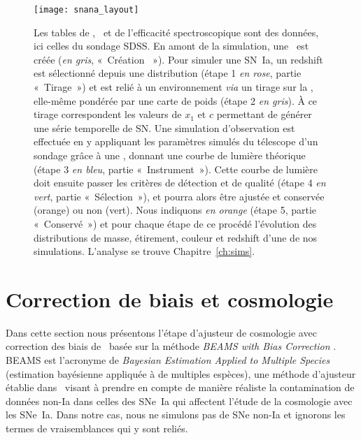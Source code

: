 \documentclass[../main/main.tex]{subfiles}
\begin{document}
\begin{figure}[p]
    \vspace*{-2.9cm}
    \centerfloat
    \texttt{[image: snana\_layout]}
    \caption[Schéma de fonctionnement d'une simulation avec
    \snana]{\footnotesize Les tables de \wgtmap, \simlib\ et de l'efficacité
        spectroscopique sont des données, ici celles du sondage SDSS. En amont
        de la simulation, une \hostlib\ est créée (\textit{en gris}, «~Création
        \hostlib~»). Pour simuler une SN~Ia, un redshift est sélectionné depuis
        une distribution (étape 1 \textit{en rose}, partie «~Tirage~») et est
        relié à un environnement \textit{via} un tirage sur la \hostlib,
        elle-même pondérée par une carte de poids (étape 2 \textit{en gris}). À
        ce tirage correspondent les valeurs de $x_1$ et $c$ permettant de
        générer une série temporelle de SN. Une simulation d'observation est
        effectuée en y appliquant les paramètres simulés du télescope d'un
        sondage grâce à une \simlib, donnant une courbe de lumière théorique
        (étape 3 \textit{en bleu}, partie «~Instrument~»). Cette courbe de
        lumière doit ensuite passer les critères de détection et de qualité
        (étape 4 \textit{en vert}, partie «~Sélection~»), et pourra alors être
        ajustée et conservée (orange) ou non (vert). Nous indiquons \textit{en
        orange} (étape 5, partie «~Conservé~») et pour chaque étape de ce
        procédé l'évolution des distributions de masse, étirement, couleur et
        redshift d'une de nos simulations. L'analyse se trouve
    Chapitre~\ref{ch:sims}.}\label{fig:snana_func}
\end{figure}

\section{Correction de biais et cosmologie}\label{sec:biais}

Dans cette section nous présentons l'étape d'ajusteur de cosmologie avec
correction des biais de \snana\ basée sur la méthode \textit{BEAMS with Bias
Correction} \citep[\bbc,][]{kessler2017}. BEAMS est l'acronyme de
\textit{Bayesian Estimation Applied to Multiple Species} (estimation bayésienne
appliquée à de multiples espèces), une méthode d'ajusteur établie
dans~\cite{kunz2007} visant à prendre en compte de manière réaliste la
contamination de données non-Ia dans celles des SNe~Ia qui affectent l'étude de
la cosmologie avec les SNe~Ia. Dans notre cas, nous ne simulons pas de SNe
non-Ia et ignorons les termes de vraisemblances qui y sont reliés.
\end{document}
